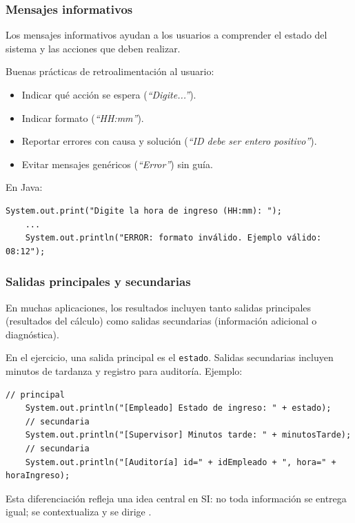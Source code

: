 \documentclass[12pt,twoside]{book}
\begin{document}
					\subsubsection{Mensajes informativos}
						\noindent
						Los mensajes informativos ayudan a los usuarios a comprender el estado del sistema y las acciones que deben realizar.
						
						Buenas prácticas de retroalimentación al usuario:
						\begin{itemize}
							\item Indicar qué acción se espera (\emph{``Digite...''}).
							\item Indicar formato (\emph{``HH:mm''}).
							\item Reportar errores con causa y solución (\emph{``ID debe ser entero positivo''}).
							\item Evitar mensajes genéricos (\emph{``Error''}) sin guía.
						\end{itemize}
						
						\noindent
						En Java:
						
						\begin{lstlisting}[style=Java,caption={Mensajes informativos: solicitud y error claro.},label={lst:MensajesInformativos}]
	System.out.print("Digite la hora de ingreso (HH:mm): ");
	...
	System.out.println("ERROR: formato inválido. Ejemplo válido: 08:12"); \end{lstlisting}
						
					\subsubsection{Salidas principales y secundarias}
						\noindent
						En muchas aplicaciones, los resultados incluyen tanto salidas principales (resultados del cálculo) como salidas secundarias (información adicional o diagnóstica).
						
						En el ejercicio, una salida principal es el \texttt{estado}. Salidas secundarias incluyen minutos de tardanza y registro para auditoría. Ejemplo:
						
						\begin{lstlisting}[style=Java,caption={Salida principal y secundaria (por roles).},label={lst:SalidasPrincipalesSecundarias}]
	// principal
	System.out.println("[Empleado] Estado de ingreso: " + estado);
	// secundaria
	System.out.println("[Supervisor] Minutos tarde: " + minutosTarde);       
	// secundaria
	System.out.println("[Auditoría] id=" + idEmpleado + ", hora=" + horaIngreso); \end{lstlisting}
						\noindent
						Esta diferenciación refleja una idea central en SI: no toda información se entrega igual; se contextualiza y se dirige \cite{Laudon2020Management,Kendall2014Systems}.
						
\end{document}
